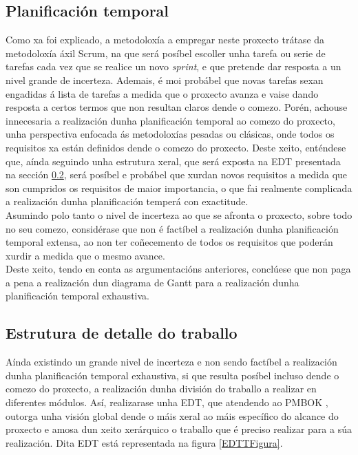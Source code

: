 \subsection{Planificación temporal}

Como xa foi explicado, a metodoloxía a empregar neste proxecto trátase da metodoloxía áxil Scrum, na que será posíbel escoller unha tarefa ou serie de tarefas cada vez que se realice un novo \textit{sprint}, e que pretende dar resposta a un nivel grande de incerteza. Ademais, é moi probábel que novas tarefas sexan engadidas á lista de tarefas a medida que o proxecto avanza e vaise dando resposta a certos termos que non resultan claros dende o comezo. Porén, achouse innecesaria a realización dunha planificación temporal ao comezo do proxecto, unha perspectiva enfocada ás metodoloxías pesadas ou clásicas, onde todos os requisitos xa están definidos dende o comezo do proxecto. Deste xeito, enténdese que, aínda seguindo unha estrutura xeral, que será exposta na \gls{EDT} presentada na sección \ref{EDTT}, será posíbel e probábel que xurdan novos requisitos a medida que son cumpridos os requisitos de maior importancia, o que fai realmente complicada a realización dunha planificación temperá con exactitude.\\

Asumindo polo tanto o nivel de incerteza ao que se afronta o proxecto, sobre todo no seu comezo, considérase que non é factíbel a realización dunha planificación temporal extensa, ao non ter coñecemento de todos os requisitos que poderán xurdir a medida que o mesmo avance.\\

Deste xeito, tendo en conta as argumentacións anteriores, conclúese que non paga a pena a realización dun diagrama de Gantt para a realización dunha planificación temporal exhaustiva.

\subsection{Estrutura de detalle do traballo}
\label{EDTT}

Aínda existindo un grande nivel de incerteza e non sendo factíbel a realización dunha planificación temporal exhaustiva, si que resulta posíbel incluso dende o comezo do proxecto, a realización dunha división do traballo a realizar en diferentes módulos. Así, realizarase unha \gls{EDT}, que atendendo ao PMBOK \cite{PMBOK}, outorga unha visión global dende o máis xeral ao máis específico do alcance do proxecto e amosa dun xeito xerárquico o traballo que é preciso realizar para a súa realización. Dita \gls{EDT} está representada na figura \ref{EDTTFigura}.

